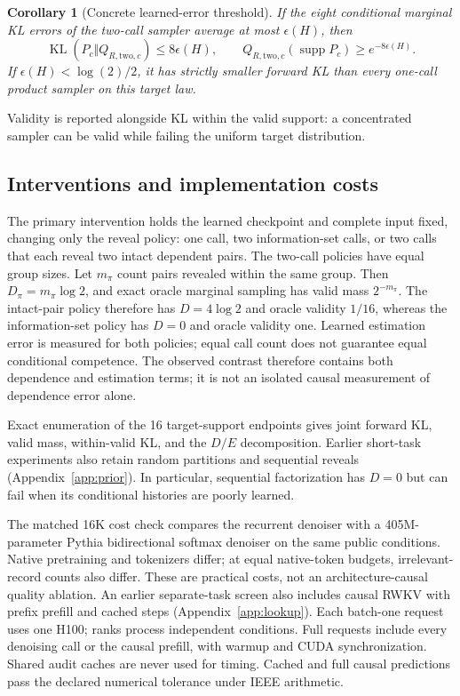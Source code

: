 \documentclass{article}
\newtheorem{corollary}{Corollary}
\newcommand{\KL}{\operatorname{KL}}
\begin{document}
\begin{corollary}[Concrete learned-error threshold]
If the eight conditional marginal KL errors of the two-call sampler average
at most $\epsilon(H)$, then
\begin{equation}
 \KL(P_c\Vert Q_{R,\mathrm{two},c})\le8\epsilon(H),\qquad
 Q_{R,\mathrm{two},c}(\operatorname{supp}P_c)\ge e^{-8\epsilon(H)}.
\end{equation}
If $\epsilon(H)<\log(2)/2$, it has strictly smaller forward KL than every
one-call product sampler on this target law.
\end{corollary}
Validity is reported alongside KL within the valid support: a concentrated
sampler can be valid while failing the uniform target distribution.



\subsection{Interventions and implementation costs}
The primary intervention holds the learned checkpoint and complete input fixed,
changing only the reveal policy: one call, two information-set calls, or two
calls that each reveal two intact dependent pairs. The two-call policies have
equal group sizes. Let $m_\pi$ count pairs revealed within the same group.
Then $D_\pi=m_\pi\log2$, and exact oracle marginal sampling has valid mass
$2^{-m_\pi}$. The intact-pair policy therefore has $D=4\log2$ and oracle
validity $1/16$, whereas the information-set policy has $D=0$ and oracle
validity one. Learned estimation error is measured for both policies; equal
call count does not guarantee equal conditional competence. The observed
contrast therefore contains both dependence and estimation terms; it is not
an isolated causal measurement of dependence error alone.

Exact enumeration of the 16 target-support endpoints gives joint forward KL,
valid mass, within-valid KL, and the $D/E$ decomposition. Earlier short-task
experiments also retain random partitions and sequential reveals
(Appendix~\ref{app:prior}). In particular, sequential factorization has $D=0$
but can fail when its conditional histories are poorly learned.

The matched 16K cost check compares the recurrent denoiser with a
405M-parameter Pythia bidirectional softmax denoiser on the same public
conditions. Native pretraining and tokenizers differ; at equal native-token
budgets, irrelevant-record counts also differ. These are practical costs,
not an architecture-causal quality ablation. An earlier separate-task screen
also includes causal RWKV with prefix prefill and cached steps
(Appendix~\ref{app:lookup}). Each batch-one request uses one H100; ranks
process independent conditions. Full requests include every
denoising call or the causal prefill, with warmup and CUDA synchronization.
Shared audit caches are never used for timing. Cached and full causal
predictions pass the declared numerical tolerance under IEEE arithmetic.
\end{document}

